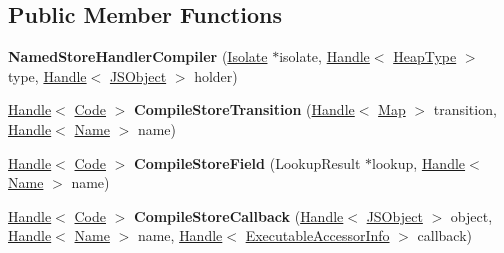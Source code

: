 \subsection*{Public Member Functions}
\begin{DoxyCompactItemize}
\item 
\hypertarget{classv8_1_1internal_1_1_named_store_handler_compiler_a57d6baa4f82a87b58ef0b61dd70ee1e9}{}{\bfseries Named\+Store\+Handler\+Compiler} (\hyperlink{classv8_1_1internal_1_1_isolate}{Isolate} $\ast$isolate, \hyperlink{classv8_1_1internal_1_1_handle}{Handle}$<$ \hyperlink{classv8_1_1internal_1_1_type_impl}{Heap\+Type} $>$ type, \hyperlink{classv8_1_1internal_1_1_handle}{Handle}$<$ \hyperlink{classv8_1_1internal_1_1_j_s_object}{J\+S\+Object} $>$ holder)\label{classv8_1_1internal_1_1_named_store_handler_compiler_a57d6baa4f82a87b58ef0b61dd70ee1e9}

\item 
\hypertarget{classv8_1_1internal_1_1_named_store_handler_compiler_aff4a326e1e65e69277575554a7daf7e6}{}\hyperlink{classv8_1_1internal_1_1_handle}{Handle}$<$ \hyperlink{classv8_1_1internal_1_1_code}{Code} $>$ {\bfseries Compile\+Store\+Transition} (\hyperlink{classv8_1_1internal_1_1_handle}{Handle}$<$ \hyperlink{classv8_1_1internal_1_1_map}{Map} $>$ transition, \hyperlink{classv8_1_1internal_1_1_handle}{Handle}$<$ \hyperlink{classv8_1_1internal_1_1_name}{Name} $>$ name)\label{classv8_1_1internal_1_1_named_store_handler_compiler_aff4a326e1e65e69277575554a7daf7e6}

\item 
\hypertarget{classv8_1_1internal_1_1_named_store_handler_compiler_a013150c3452dd0cb47accd383f17a211}{}\hyperlink{classv8_1_1internal_1_1_handle}{Handle}$<$ \hyperlink{classv8_1_1internal_1_1_code}{Code} $>$ {\bfseries Compile\+Store\+Field} (Lookup\+Result $\ast$lookup, \hyperlink{classv8_1_1internal_1_1_handle}{Handle}$<$ \hyperlink{classv8_1_1internal_1_1_name}{Name} $>$ name)\label{classv8_1_1internal_1_1_named_store_handler_compiler_a013150c3452dd0cb47accd383f17a211}

\item 
\hypertarget{classv8_1_1internal_1_1_named_store_handler_compiler_a37af4cec2404ec846e40f54eaf719636}{}\hyperlink{classv8_1_1internal_1_1_handle}{Handle}$<$ \hyperlink{classv8_1_1internal_1_1_code}{Code} $>$ {\bfseries Compile\+Store\+Callback} (\hyperlink{classv8_1_1internal_1_1_handle}{Handle}$<$ \hyperlink{classv8_1_1internal_1_1_j_s_object}{J\+S\+Object} $>$ object, \hyperlink{classv8_1_1internal_1_1_handle}{Handle}$<$ \hyperlink{classv8_1_1internal_1_1_name}{Name} $>$ name, \hyperlink{classv8_1_1internal_1_1_handle}{Handle}$<$ \hyperlink{classv8_1_1internal_1_1_executable_accessor_info}{Executable\+Accessor\+Info} $>$ callback)\label{classv8_1_1internal_1_1_named_store_handler_compiler_a37af4cec2404ec846e40f54eaf719636}


\end{DoxyCompactItemize}
